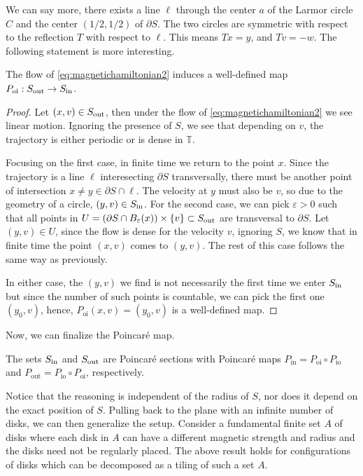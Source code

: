 We can say more, there exists a line $\ell$ through the center $a$ of the Larmor circle $C$ and the center $(1/2,1/2)$ of $\partial S$. The two circles are symmetric with respect to the reflection $T$ with respect to $\ell$. This means $Tx=y$, and $Tv = -w$. The following statement is more interesting.

\begin{lemma}\label{lem:SoutToSin}
The flow of \eqref{eq:magnetichamiltonian2} induces a well-defined map $P_\text{oi}:S_\text{out}\to S_\text{in}$.
\end{lemma}
\begin{proof}
Let $(x,v)\in S_\text{out}$, then under the flow of \eqref{eq:magnetichamiltonian2} we see linear motion. Ignoring the presence of $S$, we see that depending on $v$, the trajectory is either periodic or is dense in $\mathbb T$.

Focusing on the first case, in finite time we return to the point $x$. Since the trajectory is a line $\ell$ interesecting $\partial S$ transversally, there must be another point of intersection $x\neq y\in\partial S\cap\ell$. The velocity at $y$ must also be $v$, so due to the geometry of a circle, $(y,v)\in S_\text{in}$. For the second case, we can pick $\varepsilon>0$ such that all points in $U=(\partial S\cap B_\varepsilon(x))\times\{v\}\subset S_\text{out}$ are transversal to $\partial S$. Let $(y,v)\in U$, since the flow is dense for the velocity $v$, ignoring $S$, we know that in finite time the point $(x,v)$ comes to $(y,v)$. The rest of this case follows the same way as previously. 

In either case, the $(y,v)$ we find is not necessarily the first time we enter $S_\text{in}$ but since the number of such points is countable, we can pick the first one $(y_0,v)$, hence, $P_\text{oi}(x,v) = (y_0,v)$ is a well-defined map.
\end{proof}

Now, we can finalize the Poincar\'e map.

\begin{proposition}
The sets $S_\text{in}$ and $S_\text{out}$ are Poincar\'e sections with Poincar\'e maps $P_\text{in} = P_\text{oi}\circ P_\text{io}$ and $P_\text{out}= P_\text{io}\circ P_\text{oi}$, respectively.
\end{proposition}

Notice that the reasoning is independent of the radius of $S$, nor does it depend on the exact position of $S$. Pulling back to the plane with an infinite number of disks, we can then generalize the setup. Consider a fundamental finite set $A$ of disks where each disk in $A$ can have a different magnetic strength and radius and the disks need not be regularly placed. The above result holds for configurations of disks which can be decomposed as a tiling of such a set $A$.

